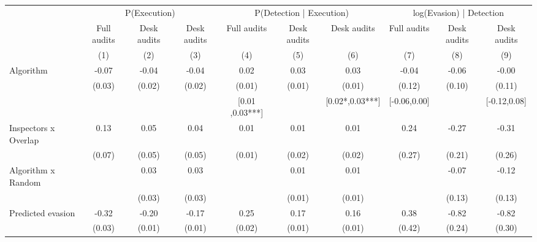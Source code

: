 \begin{tabular}{lccc|ccc|ccc} \toprule
\multicolumn{1}{l}{} & \multicolumn{3}{c}{P(Execution)} & \multicolumn{3}{c}{P(Detection | Execution)} & \multicolumn{3}{c}{log(Evasion) | Detection} \\\cmidrule(lr){2-4}\cmidrule(lr){5-7}\cmidrule(lr){8-10} \multicolumn{1}{l}{} & Full audits & Desk audits & Desk audits & Full audits & Desk audits & Desk audits & Full audits & Desk audits & Desk audits \\ \multicolumn{1}{l}{} & (1) & (2) & (3) & (4) & (5) & (6) & (7) & (8) & (9) \\ \midrule
Algorithm   &       -0.07\sym{**} &       -0.04\sym{*}  &       -0.04\sym{*}  &        0.02\sym{**} &        0.03\sym{***}&        0.03\sym{***}&       -0.04         &       -0.06         &       -0.00         \\
            &      (0.03)         &      (0.02)         &      (0.02)         &      (0.01)         &      (0.01)         &      (0.01)         &      (0.12)         &      (0.10)         &      (0.11)         \\
\addlinespace
 & & & & [0.01 ,0.03***] & & [0.02*,0.03***] & [-0.06,0.00] & & [-0.12,0.08] \\  Inspectors x Overlap&        0.13\sym{*}  &        0.05         &        0.04         &        0.01         &        0.01         &        0.01         &        0.24         &       -0.27         &       -0.31         \\
            &      (0.07)         &      (0.05)         &      (0.05)         &      (0.01)         &      (0.02)         &      (0.02)         &      (0.27)         &      (0.21)         &      (0.26)         \\
\addlinespace
Algorithm x Random&                     &        0.03         &        0.03         &                     &        0.01         &        0.01         &                     &       -0.07         &       -0.12         \\
            &                     &      (0.03)         &      (0.03)         &                     &      (0.01)         &      (0.01)         &                     &      (0.13)         &      (0.13)         \\
\addlinespace
Predicted evasion&       -0.32\sym{***}&       -0.20\sym{***}&       -0.17\sym{***}&        0.25\sym{***}&        0.17\sym{***}&        0.16\sym{***}&        0.38         &       -0.82\sym{***}&       -0.82\sym{***}\\
            &      (0.03)         &      (0.01)         &      (0.01)         &      (0.02)         &      (0.01)         &      (0.01)         &      (0.42)         &      (0.24)         &      (0.30)         \\

\end{tabular}
